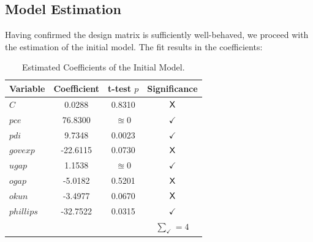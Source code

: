 \subsection{Model Estimation}\label{subsec:model_estimation}

Having confirmed the design matrix is sufficiently well-behaved, we proceed with the estimation of the initial model.
The fit results in the coefficients:
\begin{table}[H]
    \centering
    \begin{tabular}{lccc}
        \toprule
        \textbf{Variable} & \textbf{Coefficient} & \textbf{t-test $p$} & \textbf{Significance} \\
        \midrule
        $C$ & 0.0288 & 0.8310 & $\text{\sffamily{X}}$ \\ 
        $pce$ & 76.8300 & $\approxeq 0$ & $\checkmark$ \\
        $pdi$ & 9.7348 & 0.0023 & $\checkmark$ \\
        $govexp$ & -22.6115 & 0.0730 & $\text{\sffamily{X}}$ \\
        $ugap$ & 1.1538 & $\approxeq 0$ & $\checkmark$ \\
        $ogap$ & -5.0182 & 0.5201 & $\text{\sffamily{X}}$ \\
        $okun$ &  -3.4977 & 0.0670 & $\text{\sffamily{X}}$ \\
        $phillips$ & -32.7522 & 0.0315 & $\checkmark$ \\
        \midrule
        & & & $\sum_\checkmark = 4$ \\
        \bottomrule
    \end{tabular}
    \caption{Estimated Coefficients of the Initial Model.}
    \label{tab:estimated_coefficients}
\end{table}


